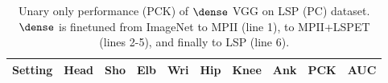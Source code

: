 \tabcolsep 1.5pt
\begin{table}[tbp]
 \scriptsize
  \centering
  \begin{tabular}{@{} l c ccc ccc c|c@{}}
    \toprule
    Setting& Head   & Sho  & Elb & Wri & Hip & Knee & Ank & PCK & AUC\\
    \midrule
    
    
    
    
    
     

    \bottomrule \end{tabular} 
\vspace{0.3em} 
    \caption[]{Unary only performance (PCK) of $\dense$ VGG on LSP
    (PC) dataset. $\dense$ is finetuned from ImageNet to MPII (line
    1), to MPII+LSPET (lines 2-5), and finally to LSP (line 6).}

\vspace{-1.0em} \label{tab:unary:dense}
\end{table}

